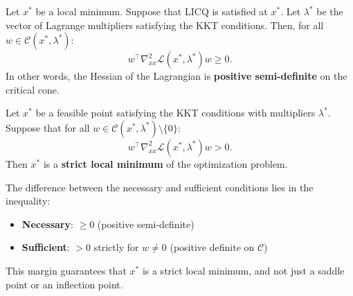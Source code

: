 \begin{theoreme}
    Let $x^*$ be a local minimum. Suppose that LICQ is satisfied at $x^*$. Let $\lambda^*$ be the vector of Lagrange multipliers satisfying the KKT conditions. Then, for all $w \in \mathcal{C}(x^*, \lambda^*)$:
    \begin{equation}
        w^\top \nabla_{xx}^2 \mathcal{L}(x^*, \lambda^*) w \geq 0.
    \end{equation}
    In other words, the Hessian of the Lagrangian is \textbf{positive semi-definite} on the critical cone.
\end{theoreme}

\begin{theoreme}
    Let $x^*$ be a feasible point satisfying the KKT conditions with multipliers $\lambda^*$. Suppose that for all $w \in \mathcal{C}(x^*, \lambda^*) \setminus \{0\}$:
    \begin{equation}
        w^\top \nabla_{xx}^2 \mathcal{L}(x^*, \lambda^*) w > 0.
    \end{equation}
    Then $x^*$ is a \textbf{strict local minimum} of the optimization problem.
\end{theoreme}

\begin{remarque}
    The difference between the necessary and sufficient conditions lies in the inequality:
    \begin{itemize}
        \item \textbf{Necessary}: $\geq 0$ (positive semi-definite)
        \item \textbf{Sufficient}: $> 0$ strictly for $w \neq 0$ (positive definite on $\mathcal{C}$)
    \end{itemize}
    This margin guarantees that $x^*$ is a strict local minimum, and not just a saddle point or an inflection point.
\end{remarque}

